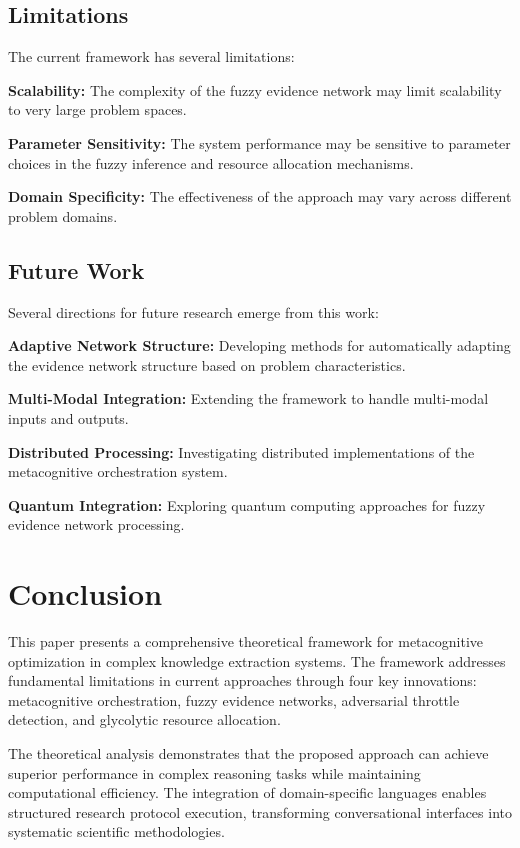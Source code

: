 \documentclass[12pt,a4paper]{article}
\begin{document}
\subsection{Limitations}

The current framework has several limitations:

\textbf{Scalability:} The complexity of the fuzzy evidence network may limit scalability to very large problem spaces.

\textbf{Parameter Sensitivity:} The system performance may be sensitive to parameter choices in the fuzzy inference and resource allocation mechanisms.

\textbf{Domain Specificity:} The effectiveness of the approach may vary across different problem domains.

\subsection{Future Work}

Several directions for future research emerge from this work:

\textbf{Adaptive Network Structure:} Developing methods for automatically adapting the evidence network structure based on problem characteristics.

\textbf{Multi-Modal Integration:} Extending the framework to handle multi-modal inputs and outputs.

\textbf{Distributed Processing:} Investigating distributed implementations of the metacognitive orchestration system.

\textbf{Quantum Integration:} Exploring quantum computing approaches for fuzzy evidence network processing.

\section{Conclusion}

This paper presents a comprehensive theoretical framework for metacognitive optimization in complex knowledge extraction systems. The framework addresses fundamental limitations in current approaches through four key innovations: metacognitive orchestration, fuzzy evidence networks, adversarial throttle detection, and glycolytic resource allocation.

The theoretical analysis demonstrates that the proposed approach can achieve superior performance in complex reasoning tasks while maintaining computational efficiency. The integration of domain-specific languages enables structured research protocol execution, transforming conversational interfaces into systematic scientific methodologies.
\end{document}
